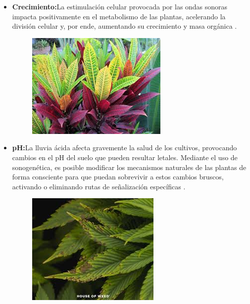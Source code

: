 \documentclass[twocolumn]{article}
\begin{document}
\begin{itemize}
\item \textbf{Crecimiento:}La estimulación celular provocada por las ondas sonoras impacta positivamente en el metabolismo de las plantas, acelerando la división celular y, por ende, aumentando su crecimiento y masa orgánica \cite{collins2001effect}.
\begin{figure}[!h]
    \centering
    \includegraphics[width=\linewidth]{imagenes/images (2).jpeg}       
\end{figure}

\item \textbf{pH:}La lluvia ácida afecta gravemente la salud de los cultivos, provocando cambios en el pH del suelo que pueden resultar letales. Mediante el uso de sonogenética, es posible modificar los mecanismos naturales de las plantas de forma consciente para que puedan sobrevivir a estos cambios bruscos, activando o eliminando rutas de señalización específicas \cite{altuntas2019tomato}.
\begin{figure}[!h]
    \centering
    \includegraphics[width=\linewidth]{imagenes/images (3).jpeg}       
\end{figure}


\end{itemize}
\end{document}
